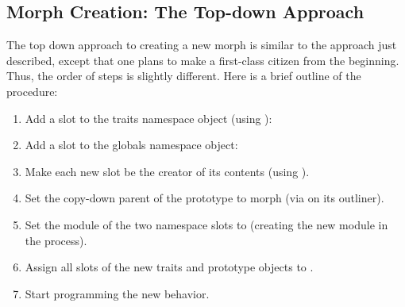 \documentclass[letterpaper,10pt,english]{sphinxmanual}
\begin{document}
\subsection{Morph Creation: The Top-down Approach}
\label{\detokenize{morphic:morph-creation-the-top-down-approach}}
The top down approach to creating a new morph is similar to the approach just described, except that one plans to make a first-class citizen from the beginning. Thus, the order of steps is slightly different. Here is a brief outline of the procedure:
\begin{enumerate}
\item {} 
Add a slot to the traits namespace object (using ):

\begin{sphinxVerbatim}[commandchars=\\\{\}]
       
\end{sphinxVerbatim}

\item {} 
Add a slot to the globals namespace object:

\begin{sphinxVerbatim}[commandchars=\\\{\}]
       
\end{sphinxVerbatim}

\item {} 
Make each new slot be the creator of its contents (using ).

\item {} 
Set the copy-down parent of the prototype to morph (via  on its outliner).

\item {} 
Set the module of the two namespace slots to  (creating the new module in the process).

\item {} 
Assign all slots of the new traits and prototype objects to .

\item {} 
Start programming the new behavior.

\end{enumerate}
\end{document}
